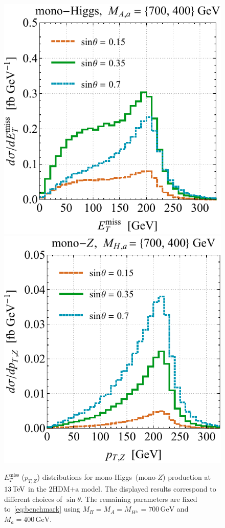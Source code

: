 \documentclass[review]{elsarticle}
\newcommand{\MET}{\ensuremath{E_T^\mathrm{miss}}\xspace}
\newcommand{\mA}{\ensuremath{M_{A}}\xspace}
\newcommand{\ma}{\ensuremath{M_{a}}\xspace}
\newcommand{\mH}{\ensuremath{M_{H}}\xspace}
\newcommand{\mHc}{\ensuremath{M_{H^{\pm}}}\xspace}
\newcommand{\hdma}{\ensuremath{\textrm{2HDM+a}}\xspace}
\begin{document}
\begin{figure}[t!]
\centering
\includegraphics[height=0.45\textwidth]{svarl.pdf} \qquad 
\includegraphics[height=0.45\textwidth]{svarr.pdf}
\vspace{2mm}
\caption{\label{fig:svar} $\MET$ ($p_{T,Z}$) distributions for mono-Higgs~(mono-$Z$) production at $13 \, {\rm TeV}$  in the \hdma model. The displayed results correspond to different choices of $\sin \theta$. The remaining parameters are fixed to~\eqref{eq:benchmark} using $\mH = \mA = \mHc = 700 \, {\mathrm{GeV}}$ and $\ma = 400 \, {\mathrm{GeV}}$. }
\end{figure}
\end{document}
